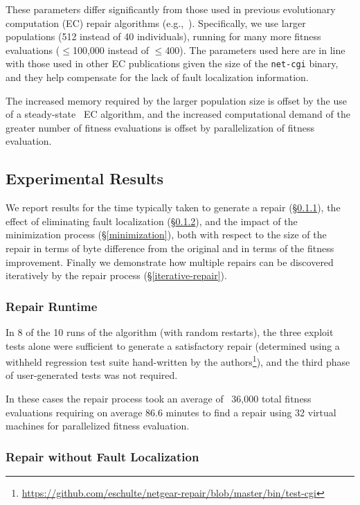 \documentclass{sig-alternate}
\begin{document}
These parameters differ significantly from those used in previous
evolutionary computation (EC) repair algorithms
(e.g.,~\cite{forrest2009genetic,legoues2011systematicstudy,le2012representations}).
Specifically, we use larger populations (512 instead of 40
individuals), running for many more fitness evaluations ($\leq$100,000
instead of $\leq$400).  The parameters used here are in line with
those used in other EC publications given the size of the
\texttt{net-cgi} binary, and they help compensate for the lack of
fault localization information.

The increased memory required by the larger population size is offset
by the use of a steady-state~\cite{Luke2013Metaheuristics} EC
algorithm, and the increased computational demand of the greater
number of fitness evaluations is offset by parallelization of fitness
evaluation.

\subsection{Experimental Results}
\label{analysis}

We report results for the time typically taken to generate a repair
(\S\ref{runtime}), the effect of eliminating fault localization
(\S\ref{no-fault-localization}), and the impact of the minimization
process (\S\ref{minimization}), both with respect to the size of the
repair in terms of byte difference from the original and in terms of
the fitness improvement.  Finally we demonstrate how multiple repairs
can be discovered iteratively by the repair process
(\S\ref{iterative-repair}).

\subsubsection{Repair Runtime}
\label{runtime}
In 8 of the 10 runs of the algorithm (with random restarts), the three
exploit tests alone were sufficient to generate a satisfactory repair
(determined using a withheld regression test suite hand-written by the
authors\footnote{\url{https://github.com/eschulte/netgear-repair/blob/master/bin/test-cgi}}),
and the third phase of user-generated tests was not required.

In these cases the repair process took an average of ~36,000 total
fitness evaluations requiring on average 86.6 minutes to find a repair
using 32 virtual machines for parallelized fitness evaluation.

\subsubsection{Repair without Fault Localization}
\label{no-fault-localization}
\end{document}
